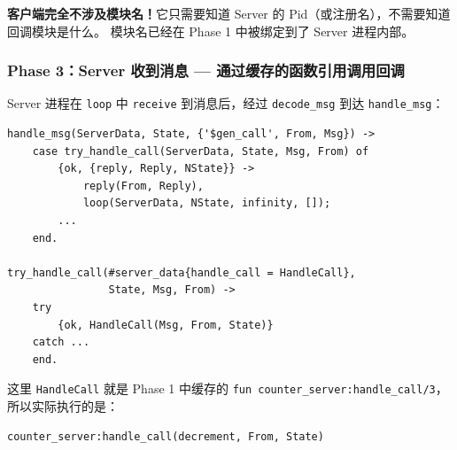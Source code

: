 \documentclass[a4paper,11pt]{article}
\begin{document}
\begin{warnbox}[关键观察]
\textbf{客户端完全不涉及模块名！}它只需要知道 Server 的 Pid（或注册名），不需要知道回调模块是什么。
模块名已经在 Phase 1 中被绑定到了 Server 进程内部。
\end{warnbox}

\subsubsection{Phase 3：Server 收到消息 --- 通过缓存的函数引用调用回调}

Server 进程在 \texttt{loop} 中 \texttt{receive} 到消息后，经过 \texttt{decode\_msg} 到达 \texttt{handle\_msg}：

\begin{lstlisting}[style=erlangstyle, caption={handle\_msg 和 try\_handle\_call 源码}]
handle_msg(ServerData, State, {'$gen_call', From, Msg}) ->
    case try_handle_call(ServerData, State, Msg, From) of
        {ok, {reply, Reply, NState}} ->
            reply(From, Reply),
            loop(ServerData, NState, infinity, []);
        ...
    end.

try_handle_call(#server_data{handle_call = HandleCall},
                State, Msg, From) ->
    try
        {ok, HandleCall(Msg, From, State)}
    catch ...
    end.
\end{lstlisting}

这里 \texttt{HandleCall} 就是 Phase 1 中缓存的 \texttt{fun counter\_server:handle\_call/3}，
所以实际执行的是：

\begin{lstlisting}[style=erlangstyle, caption={最终的回调调用}]
counter_server:handle_call(decrement, From, State)
\end{lstlisting}
\end{document}
